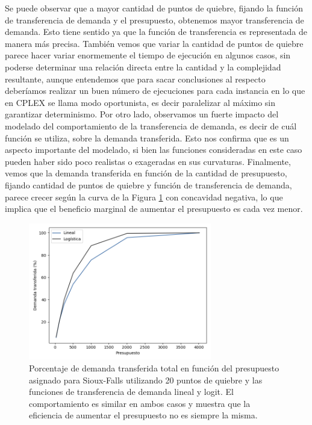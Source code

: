 \documentclass{article}
\begin{document}
  Se puede observar que a mayor cantidad de puntos de quiebre, fijando la función de transferencia de demanda y el presupuesto, obtenemos mayor transferencia de demanda. Esto tiene sentido ya que la función de transferencia es representada de manera más precisa. También vemos que variar la cantidad de puntos de quiebre parece hacer variar enormemente el tiempo de ejecución en algunos casos, sin poderse determinar una relación directa entre la cantidad y la complejidad resultante, aunque entendemos que para sacar conclusiones al respecto deberíamos realizar un buen número de ejecuciones para cada instancia en lo que en CPLEX se llama modo oportunista, es decir paralelizar al máximo sin garantizar determinismo. Por otro lado, observamos un fuerte impacto del modelado del comportamiento de la transferencia de demanda, es decir de cuál función se utiliza, sobre la demanda transferida. Esto nos confirma que es un aspecto importante del modelado, si bien las funciones consideradas en este caso pueden haber sido poco realistas o exageradas en sus curvaturas. Finalmente, vemos que la demanda transferida en función de la cantidad de presupuesto, fijando cantidad de puntos de quiebre y función de transferencia de demanda, parece crecer según la curva de la Figura \ref{fig:demandtransferbybudgetlinear} con concavidad negativa, lo que implica que el beneficio marginal de aumentar el presupuesto es cada vez menor.

  \begin{figure}[h!]
    \centering
    \includegraphics[width=8cm]{../resources/demand_by_budget.png}
      \caption{Porcentaje de demanda transferida total en función del presupuesto asignado para Sioux-Falls utilizando 20 puntos de quiebre y las funciones de transferencia de demanda lineal y logit. El comportamiento es similar en ambos casos y muestra que la eficiencia de aumentar el presupuesto no es siempre la misma.}
    \label{fig:demandtransferbybudgetlinear}
  \end{figure}
\end{document}
